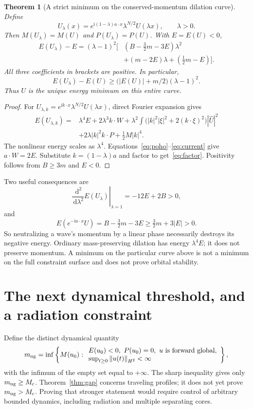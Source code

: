 \documentclass[11pt,a4paper]{article}
\newtheorem{theorem}{Theorem}[section]
\theoremstyle{remark}\newtheorem{remark}[theorem]{Remark}
\newcommand{\ii}{\mathrm i}\newcommand{\dd}{\,\mathrm d}
\newcommand{\norm}[1]{\left\|#1\right\|}
\begin{document}
\begin{theorem}[A strict minimum on the conserved-momentum dilation curve]
Define
\[
 U_\lambda(x)=e^{\ii(1-\lambda)a\cdot x}\lambda^{N/2}U(\lambda x),
 \qquad \lambda>0.
\]
Then $M(U_\lambda)=M(U)$ and $P(U_\lambda)=P(U)$. With $E=E(U)<0$,
\begin{align}\label{eq:factor}
 E(U_\lambda)-E
 =(\lambda-1)^2\bigl[&(B-\tfrac32m-3E)\lambda^2\\
 &+(m-2E)\lambda+(\tfrac12m-E)\bigr].\nonumber
\end{align}
All three coefficients in brackets are positive. In particular,
\[
 E(U_\lambda)-E(U)\ge\bigl(|E(U)|+m/2\bigr)(\lambda-1)^2.
\]
Thus $U$ is the unique energy minimum on this entire curve.
\end{theorem}
\begin{proof}
For $U_{\lambda,k}=e^{\ii k\cdot x}\lambda^{N/2}U(\lambda x)$, direct Fourier expansion gives
\begin{align*}
 E(U_{\lambda,k})={}&\lambda^4E+2\lambda^3 k\cdot W
 +\lambda^2\int\bigl(|k|^2|\xi|^2+2(k\cdot\xi)^2\bigr)|\widehat U|^2\\
 &+2\lambda|k|^2 k\cdot P+\tfrac12M|k|^4.
\end{align*}
The nonlinear energy scales as $\lambda^4$. Equations~\eqref{eq:poho}--\eqref{eq:current} give $a\cdot W=2E$. Substitute $k=(1-\lambda)a$ and factor to get~\eqref{eq:factor}. Positivity follows from $B\ge3m$ and $E<0$.
\end{proof}

Two useful consequences are
\[
 \left.\frac{\dd^2}{\dd\lambda^2}E(U_\lambda)\right|_{\lambda=1}
 =-12E+2B>0,
\]
and
\begin{equation}\label{eq:boost}
 E(e^{-\ii a\cdot x}U)=B-\tfrac32m-3E
 \ge\tfrac32m+3|E|>0.
\end{equation}
So neutralizing a wave's momentum by a linear phase necessarily destroys its negative energy. Ordinary mass-preserving dilation has energy $\lambda^4E$; it does not preserve momentum. A minimum on the particular curve above is not a minimum on the full constraint surface and does not prove orbital stability.

\section{The next dynamical threshold, and a radiation constraint}
Define the distinct dynamical quantity
\[
 m_{\rm ng}=\inf\left\{M(u_0):\begin{array}{l}
 E(u_0)<0,\ P(u_0)=0,\ u\text{ is forward global},\\
 \sup_{t\ge0}\norm{u(t)}_{H^2}<\infty
 \end{array}\right\},
\]
with the infimum of the empty set equal to $+\infty$. The sharp inequality gives only $m_{\rm ng}\ge M_c$. Theorem~\ref{thm:gap} concerns traveling profiles; it does not yet prove $m_{\rm ng}>M_c$. Proving that stronger statement would require control of arbitrary bounded dynamics, including radiation and multiple separating cores.
\end{document}
